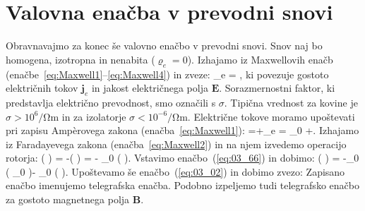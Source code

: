 \section{Valovna enačba v prevodni snovi}
\label{section:35}
Obravnavajmo za konec še valovno enačbo v prevodni snovi. Snov naj
bo homogena, izotropna in nenabita ($\varrho_e = 0$). Izhajamo
iz Maxwellovih enačb (enačbe~\ref{eq:Maxwell1}--\ref{eq:Maxwell4}) in zveze:
\beq
{}_e = \sigma {},
\label{eq:03_65}
\eeq
ki povezuje gostoto električnih tokov $\mathbf{j}_e $ in jakost 
električnega polja $\mathbf{E}$. Sorazmernostni faktor, ki predstavlja 
električno prevodnost, smo označili s $\sigma$. Tipična vrednost
za kovine je $\sigma > 10^6/\si{\ohm\m}$ in za izolatorje 
$\sigma < 10^{-6}/\si{\ohm\m}$. 
Električne tokove moramo upoštevati pri zapisu Amp\`{e}rovega zakona 
(enačba~\ref{eq:Maxwell1}):
\beq
\nabla\times{} =+_e = 
\varepsilon \varepsilon_0 +\sigma {}.
\label{eq:03_66}
\eeq
Izhajamo iz Faradayevega zakona (enačba~\ref{eq:Maxwell2}) in na njem izvedemo operacijo rotorja:
\beq
\nabla \times \left( \nabla \times  {}\right) = -\nabla\times \left(
\right) = - \mu \mu_0 
\left( \nabla \times {}\right).
\label{eq:03_67}
\eeq
Vstavimo enačbo~(\ref{eq:03_66}) in dobimo:
\beq
\nabla \times \left( \nabla \times  {}\right) =
 -\mu \mu_0 
\left( \varepsilon \varepsilon_0 \right)-
\mu \mu_0 \left(\sigma {} \right).
\label{eq:03_671}
\eeq
Upoštevamo še enačbo~(\ref{eq:03_02}) in dobimo zvezo:
Zapisano enačbo imenujemo telegrafska enačba. Podobno izpeljemo tudi telegrafsko enačbo
za gostoto magnetnega polja $\mathbf{B}$.

